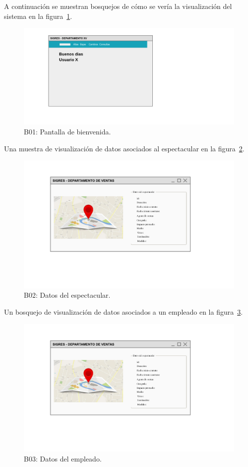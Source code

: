A continuación se muestran bosquejos de cómo se vería la visualización del sistema en la figura~\ref{fig:b1}.
\begin{figure}[H]
    \centering
    \includegraphics[scale=.3]{iu/mockup1.png}
    \centering
    \caption{B01: Pantalla de bienvenida.}
    \label{fig:b1}
\end{figure}

Una muestra de visualización de datos asociados al espectacular en la figura~\ref{fig:b2}.
\begin{figure}[H]
    \centering
    \includegraphics[scale=.4]{iu/mockup2.png}
    \centering
    \caption{B02: Datos del espectacular.}
    \label{fig:b2}
\end{figure}

Un bosquejo de visualización de datos asociados a un empleado en la figura~\ref{fig:b3}.
\begin{figure}[H]
    \centering
    \includegraphics[scale=.4]{iu/mockup2.png}
    \centering
    \caption{B03: Datos del empleado.}
    \label{fig:b3}
\end{figure}

